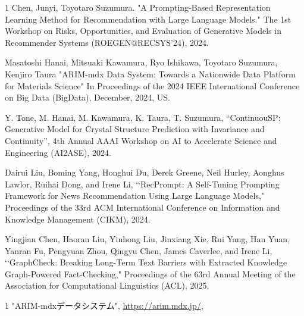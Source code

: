 \begin{査読付}{1}
Chen, Junyi, Toyotaro Suzumura. "A Prompting-Based Representation Learning Method for Recommendation with Large Language Models." The 1st Workshop on Risks, Opportunities, and Evaluation of Generative Models in Recommender Systems (ROEGEN@RECSYS'24), 2024.

Masatoshi Hanai, Mitsuaki Kawamura, Ryo Ishikawa, Toyotaro Suzumura, Kenjiro Taura
"ARIM-mdx Data System: Towards a Nationwide Data Platform for Materials Science"
In Proceedings of the 2024 IEEE International Conference on Big Data (BigData), December, 2024, US.

Y. Tone, M. Hanai, M. Kawamura, K. Taura, T. Suzumura,
``ContinuouSP: Generative Model for Crystal Structure Prediction with Invariance and Continuity'',
 4th Annual AAAI Workshop on AI to Accelerate Science and Engineering (AI2ASE), 2024.
 
Dairui Liu, Boming Yang, Honghui Du, Derek Greene, Neil Hurley, Aonghus Lawlor, Ruihai Dong, and Irene Li, \lq \lq RecPrompt: A Self-Tuning Prompting Framework for News Recommendation Using Large Language Models," Proceedings of the 33rd ACM International Conference on Information and Knowledge Management (CIKM), 2024.

Yingjian Chen, Haoran Liu, Yinhong Liu, Jinxiang Xie, Rui Yang, Han Yuan, Yanran Fu, Pengyuan Zhou, Qingyu Chen, James Caverlee, and Irene Li, \lq\lq GraphCheck: Breaking Long-Term Text Barriers with Extracted Knowledge Graph-Powered Fact-Checking," Proceedings of the 63rd Annual Meeting of the Association for Computational Linguistics (ACL), 2025.

\end{査読付}

\begin{公開}{1}
"ARIM-mdxデータシステム",
\url{https://arim.mdx.jp/},


\end{公開}



